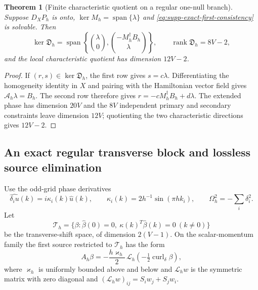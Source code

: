 \documentclass[11pt]{article}
\newtheorem{theorem}{Theorem}[section]
\theoremstyle{definition}
\theoremstyle{remark}
\newcommand{\rank}{\operatorname{rank}}
\begin{document}
\begin{theorem}[Finite characteristic quotient on a regular one-null branch]
\label{thm:supp-exact-constraint-rank}
Suppose $D_XP_h$ is onto, $\ker M_h=\operatorname{span}\{\lambda\}$ and
\eqref{eq:supp-exact-first-consistency} is solvable.  Then
\begin{equation}
 \boxed{
 \ker\mathfrak D_h=\operatorname{span}\left\{
 \binom{\lambda}{0},\binom{-M_h^\dagger B_h}{\lambda}\right\},
 \qquad \rank\mathfrak D_h=8V-2,}
 \label{eq:supp-exact-dirac-rank}
\end{equation}
and the local characteristic quotient has dimension $12V-2$.
\end{theorem}
\begin{proof}
If $(r,s)\in\ker\mathfrak D_h$, the first row gives $s=c\lambda$.
Differentiating the homogeneity identity in $X$ and pairing with the
Hamiltonian vector field gives $\mathcal A_h\lambda=B_h$.  The second row
therefore gives $r=-cM_h^\dagger B_h+d\lambda$.  The extended phase has
dimension $20V$ and the $8V$ independent primary and secondary constraints
leave dimension $12V$; quotienting the two characteristic directions gives
$12V-2$.
\end{proof}

\subsection{An exact regular transverse block and lossless source elimination}

Use the odd-grid phase derivatives
\begin{equation}
 \widehat{\delta_i u}(k)=i\kappa_i(k)\widehat u(k),
 \qquad \kappa_i(k)=2h^{-1}\sin(\pi hk_i),
 \qquad \Omega_h^2=-\sum_i\delta_i^2.
 \label{eq:supp-exact-phase-derivative}
\end{equation}
Let
\begin{equation}
 \mathcal T_h=\{\beta:\widehat\beta(0)=0,
 \ \kappa(k)^T\widehat\beta(k)=0\ (k\ne0)\}
 \label{eq:supp-exact-transverse-space}
\end{equation}
be the transverse-shift space, of dimension $2(V-1)$.  On the scalar-momentum
family the first source restricted to $\mathcal T_h$ has the form
\begin{equation}
 A_h\beta=-\frac{h\varkappa_h}{2}\,\mathcal L_h
          \left(-\tfrac12\operatorname{curl}_\delta\beta\right),
 \label{eq:supp-exact-transverse-source}
\end{equation}
where $\varkappa_h$ is uniformly bounded above and below and
$\mathcal L_hw$ is the symmetric matrix with zero diagonal and
$(\mathcal L_hw)_{ij}=S_iw_j+S_jw_i$.
\end{document}
